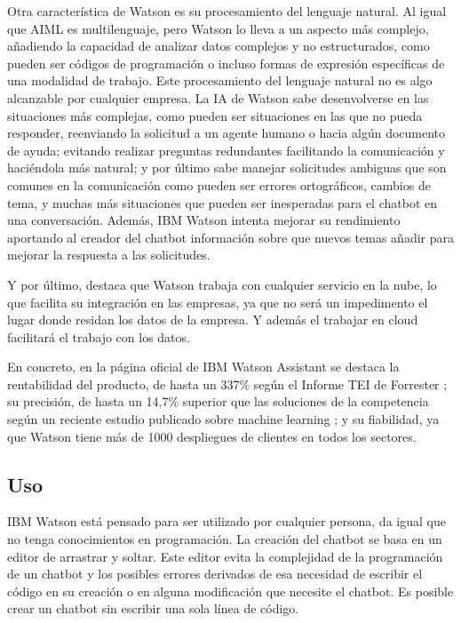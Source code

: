 Otra característica de Watson es su procesamiento del lenguaje natural. Al igual que AIML es multilenguaje, pero Watson lo lleva a un aspecto más complejo, añadiendo la capacidad de analizar datos complejos y no estructurados, como pueden ser códigos de programación o incluso formas de expresión específicas de una modalidad de trabajo. Este procesamiento del lenguaje natural no es algo alcanzable por cualquier empresa. La \gls{IA} de Watson sabe desenvolverse en las situaciones más complejas, como pueden ser situaciones en las que no pueda responder, reenviando la solicitud a un agente humano o hacia algún documento de ayuda; evitando realizar preguntas redundantes facilitando la comunicación y haciéndola más natural; y por último sabe manejar solicitudes ambiguas que son comunes en la comunicación como pueden ser errores ortográficos, cambios de tema, y muchas más situaciones que pueden ser inesperadas para el chatbot en una conversación. Además, IBM Watson intenta mejorar su rendimiento aportando al creador del chatbot información sobre que nuevos temas añadir para mejorar la respuesta a las solicitudes.

Y por último, destaca que Watson trabaja con cualquier servicio en la nube, lo que facilita su integración en las empresas, ya que no será un impedimento el lugar donde residan los datos de la empresa. Y además el trabajar en \gls{cloud} facilitará el trabajo con los datos.

En concreto, en la página oficial de IBM Watson Assistant \cite{RefWorks:RefID:17-ibm} se destaca la rentabilidad del producto, de hasta un 337\% según el Informe TEI de Forrester \cite{RefWorks:RefID:8-iles2020el}; su precisión, de hasta un 14,7\% superior que las soluciones de la competencia según un reciente estudio publicado sobre machine learning \cite{RefWorks:RefID:18-2020watson}; y su fiabilidad, ya que Watson tiene más de 1000 despliegues de clientes en todos los sectores.

\subsection*{Uso}

IBM Watson está pensado para ser utilizado por cualquier persona, da igual que no tenga conocimientos en programación. La creación del chatbot se basa en un editor de arrastrar y soltar. Este editor evita la complejidad de la programación de un chatbot y los posibles errores derivados de esa necesidad de escribir el código en su creación o en alguna modificación que necesite el chatbot. Es posible crear un chatbot sin escribir una sola línea de código.

